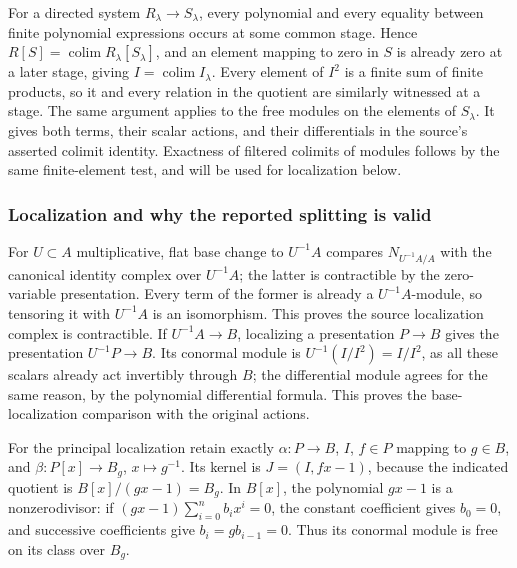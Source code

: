 For a directed system \(R_\lambda\to S_\lambda\), every polynomial and every equality between finite polynomial expressions occurs at some common stage. Hence \(R[S]=\operatorname{colim}R_\lambda[S_\lambda]\), and an element mapping to zero in \(S\) is already zero at a later stage, giving \(I=\operatorname{colim}I_\lambda\). Every element of \(I^2\) is a finite sum of finite products, so it and every relation in the quotient are similarly witnessed at a stage. The same argument applies to the free modules on the elements of \(S_\lambda\). It gives both terms, their scalar actions, and their differentials in the source's asserted colimit identity. Exactness of filtered colimits of modules follows by the same finite-element test, and will be used for localization below.

\subsubsection{Localization and why the reported splitting is valid}\label{localization-and-why-the-reported-splitting-is-valid}

For \(U\subset A\) multiplicative, flat base change to \(U^{-1}A\) compares \(N_{U^{-1}A/A}\) with the canonical identity complex over \(U^{-1}A\); the latter is contractible by the zero-variable presentation. Every term of the former is already a \(U^{-1}A\)-module, so tensoring it with \(U^{-1}A\) is an isomorphism. This proves the source localization complex is contractible. If \(U^{-1}A\to B\), localizing a presentation \(P\to B\) gives the presentation \(U^{-1}P\to B\). Its conormal module is \(U^{-1}(I/I^2)=I/I^2\), as all these scalars already act invertibly through \(B\); the differential module agrees for the same reason, by the polynomial differential formula. This proves the base-localization comparison with the original actions.

For the principal localization retain exactly \(\alpha:P\to B\), \(I\), \(f\in P\) mapping to \(g\in B\), and \(\beta:P[x]\to B_g\), \(x\mapsto g^{-1}\). Its kernel is \(J=(I,fx-1)\), because the indicated quotient is \(B[x]/(gx-1)=B_g\). In \(B[x]\), the polynomial \(gx-1\) is a nonzerodivisor: if \((gx-1)\sum_{i=0}^n b_ix^i=0\), the constant coefficient gives \(b_0=0\), and successive coefficients give \(b_i=gb_{i-1}=0\). Thus its conormal module is free on its class over \(B_g\).

